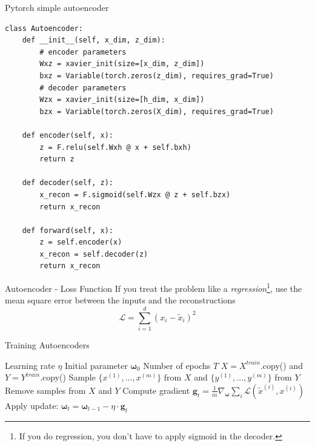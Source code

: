 \documentclass{beamer}
\begin{document}
\begin{frame}[fragile]{Pytorch simple autoencoder}
\begin{verbatim}
class Autoencoder:
    def __init__(self, x_dim, z_dim):
        # encoder parameters
        Wxz = xavier_init(size=[x_dim, z_dim])
        bxz = Variable(torch.zeros(z_dim), requires_grad=True)
        # decoder parameters
        Wzx = xavier_init(size=[h_dim, x_dim])
        bzx = Variable(torch.zeros(X_dim), requires_grad=True)
    
    def encoder(self, x):
        z = F.relu(self.Wxh @ x + self.bxh)
        return z
    
    def decoder(self, z):
        x_recon = F.sigmoid(self.Wzx @ z + self.bzx)
        return x_recon
    
    def forward(self, x):
        z = self.encoder(x)
        x_recon = self.decoder(z)
        return x_recon
\end{verbatim}
\end{frame}

\begin{frame}{Autoencoder - Loss Function}
If you treat the problem like a \textit{regression}\footnote{If you do regression, you don't have to apply sigmoid in the decoder.}, use the mean square error between the inputs and the reconstructions
\begin{equation}
\mathcal{L} = \sum_{i=1}^d (x_i-\tilde{x}_i)^2
\end{equation}
\end{frame}

\begin{frame}{Training Autoencoders}
\begin{algorithm}[H]
	\begin{algorithmic}
		\REQUIRE Learning rate $\eta$
		\REQUIRE Initial parameter $\bm{\omega}_0$
		\REQUIRE Number of epochs $T$
		\STATE $X =X^{train}$.copy() and $Y =Y^{train}$.copy()
		\STATE Sample $\{x^{(1)},...,x^{(m)}\}$ from $X$ and $\{y^{(1)},...,y^{(m)}\}$ from $Y$
		\STATE Remove samples from $X$ and $Y$
		\STATE Compute gradient $\bm{g}_t=\frac{1}{m}\nabla_{\bm{\omega}}\sum_i \mathcal{L}(\tilde{x}^{(i)}, x^{(i)})$  
		\STATE Apply update: $\bm{\omega}_t=\bm{\omega}_{t-1}-\eta\cdot \bm{g}_t$
		\ENDWHILE
		\ENDFOR
	\end{algorithmic}
	\caption{Pseudocode for Stochastic Gradient Training}
	\label{alg:sgd}
\end{algorithm}
\end{frame}
\end{document}
